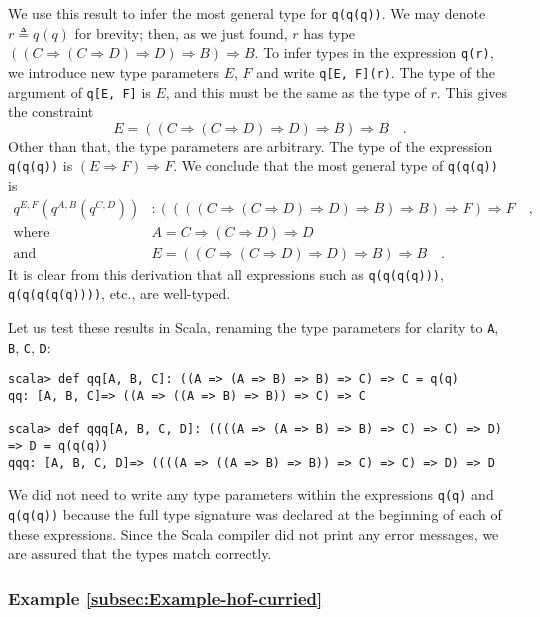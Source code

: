 We use this result to infer the most general type for \lstinline!q(q(q))!.
We may denote $r\triangleq q(q)$ for brevity; then, as we just found,
$r$ has type $\left(\left(C\Rightarrow\left(C\Rightarrow D\right)\Rightarrow D\right)\Rightarrow B\right)\Rightarrow B$.
To infer types in the expression \lstinline!q(r)!, we introduce new
type parameters $E$, $F$ and write \lstinline!q[E, F](r)!. The
type of the argument of \lstinline!q[E, F]! is $E$, and this must
be the same as the type of $r$. This gives the constraint
\[
E=\left(\left(C\Rightarrow\left(C\Rightarrow D\right)\Rightarrow D\right)\Rightarrow B\right)\Rightarrow B\quad.
\]
Other than that, the type parameters are arbitrary. The type of the
expression \lstinline!q(q(q))! is $\left(E\Rightarrow F\right)\Rightarrow F$.
We conclude that the most general type of \lstinline!q(q(q))! is
\begin{align*}
q^{E,F}(q^{A,B}(q^{C,D})) & :\left(\left(\left(\left(C\Rightarrow\left(C\Rightarrow D\right)\Rightarrow D\right)\Rightarrow B\right)\Rightarrow B\right)\Rightarrow F\right)\Rightarrow F\quad,\\
\text{where}\quad & A=C\Rightarrow\left(C\Rightarrow D\right)\Rightarrow D\\
\text{and}\quad & E=\left(\left(C\Rightarrow\left(C\Rightarrow D\right)\Rightarrow D\right)\Rightarrow B\right)\Rightarrow B\quad.
\end{align*}
It is clear from this derivation that all expressions such as \lstinline!q(q(q(q)))!,
\lstinline!q(q(q(q(q))))!, etc., are well-typed.

Let us test these results in Scala, renaming the type parameters for
clarity to \lstinline!A!, \lstinline!B!, \lstinline!C!, \lstinline!D!:
\begin{lstlisting}
scala> def qq[A, B, C]: ((A => (A => B) => B) => C) => C = q(q)
qq: [A, B, C]=> ((A => ((A => B) => B)) => C) => C

scala> def qqq[A, B, C, D]: ((((A => (A => B) => B) => C) => C) => D) => D = q(q(q))
qqq: [A, B, C, D]=> ((((A => ((A => B) => B)) => C) => C) => D) => D
\end{lstlisting}
We did not need to write any type parameters within the expressions
\lstinline!q(q)! and \lstinline!q(q(q))! because the full type signature
was declared at the beginning of each of these expressions. Since
the Scala compiler did not print any error messages, we are assured
that the types match correctly.

\subsubsection{Example \label{subsec:Example-hof-curried}\ref{subsec:Example-hof-curried}}


